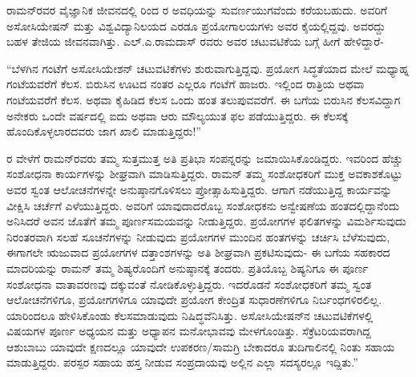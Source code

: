 ರಾಮನ್‍ರವರ ವೈಜ್ಞಾನಿಕ ಜೀವನದಲ್ಲಿ  ರಿಂದ ರ ಅವಧಿಯನ್ನು ಸುವರ್ಣಯುಗವೆಂದು ಕರೆಯಬಹುದು. ಅವರಿಗೆ ಅಸೋಸಿಯೇಷನ್ ಮತ್ತು ವಿಶ್ವವಿದ್ಯಾನಿಲಯದ ಎರಡೂ ಪ್ರಯೋಗಾಲಯಗಳು ಅವರ ಕೈಯಲ್ಲಿದ್ದವು. ಅವರದ್ದು ಬಹಳ ತೇಜಿಯ ಜೀವನವಾಗಿತ್ತು. ಎಲ್.ಎ.ರಾಮದಾಸ್ ರವರು ಅವರ ಚಟುವಟಿಕೆಯ ಬಗ್ಗೆ ಹೀಗೆ ಹೇಳಿದ್ದಾರೆ-

“ಬೆಳಗಿನ  ಗಂಟೆಗೆ ಅಸೋಸಿಯೇಶನ್ ಚಟುವಟಿಕೆಗಳು ಶುರುವಾಗುತ್ತಿದ್ದವು. ಪ್ರಯೋಗ ಸಿದ್ಧತೆಯಾದ ಮೇಲೆ ಮಧ್ಯಾಹ್ನ  ಗಂಟೆಯವರೆಗೆ ಕೆಲಸ. ಬಿರುಸಿನ ಊಟದ ನಂತರ ಎಲ್ಲರೂ  ಗಂಟೆಗೆ ಹಾಜರು. ಇಲ್ಲಿಂದ ರಾತ್ರಿಯ  ಅಥವಾ  ಗಂಟೆಯವರೆಗೆ ಕೆಲಸ. ಅಥವಾ ಕೈಹಿಡಿದ ಕೆಲಸ ಒಂದು ಹಂತ ತಲುಪುವವರೆಗೆ. ಈ ಬಗೆಯ ಬಿರುಸಿನ ಕೆಲಸವಿದ್ದಾಗ ಅನೇಕರು ಒಂದೇ ವರ್ಷದಲ್ಲಿ ಐದು ಅಥವಾ ಆರು ಮೌಲ್ಯಯುತ ಫಲ ಪಡೆಯುತ್ತಿದ್ದರು. ಈ ಕೆಲಸಕ್ಕೆ ಹೊಂದಿಕೊಳ್ಳಲಾರದವರು ಜಾಗ ಖಾಲಿ ಮಾಡುತ್ತಿದ್ದರು!”

ರ ವೇಳೆಗೆ ರಾಮನ್‍ರವರು ತಮ್ಮ ಸುತ್ತಮುತ್ತ ಅತಿ ಪ್ರತಿಭಾ ಸಂಪನ್ನರನ್ನು ಜಮಾಯಿಸಿಕೊಂಡಿದ್ದರು. ಇವರಿಂದ ಹೆಚ್ಚು ಸಂಶೋಧನಾ ಕಾರ್ಯಗಳನ್ನು ಶೀಘ್ರವಾಗಿ ಮಾಡಿಸುತ್ತಿದ್ದರು. ರಾಮನ್ ತಮ್ಮ ಸಂಶೋಧಕರಿಗೆ ಮುಕ್ತ ಅವಕಾಶಕೊಟ್ಟು ಅವರ ಸ್ವಂತ ಆಲೋಚನೆಗಳನ್ನೇ ಅನುಷ್ಠಾನಗೊಳಿಸಲು ಪ್ರೋತ್ಸಾಹಿಸುತ್ತಿದ್ದರು. ಆಗಾಗ ನಡೆಯುತ್ತಿದ್ದ ಕಾರ್ಯವನ್ನು ವೀಕ್ಷಿಸಿ ಚರ್ಚೆಗೆ ಎಳೆಯುತ್ತಿದ್ದರು. ಅವರಿಗೆ ಯಾವುದಾದರೊಬ್ಬ ಸಂಶೋಧಕನು ಅನ್ವೇಷಣೆಯ ಹಂತದಲ್ಲಿದ್ದಾನೆಂದು ಅನಿಸಿದರೆ ಅವನ ಜೊತೆಗೆ ತಮ್ಮ ಪೂರ್ಣಸಮಯವನ್ನು ನೀಡುತ್ತಿದ್ದರು. ಪ್ರಯೋಗಗಳ ಫಲಿತಗಳನ್ನು ವಿಮರ್ಶಿಸುವುದು ನಿರಂತರವಾಗಿ ಸಲಹೆ ಸೂಚನೆಗಳನ್ನು ನೀಡುವುದು ಪ್ರಯೋಗಗಳ ಮುಂದಿನ ಹಂತಗಳನ್ನು ಚರ್ಚಿಸಿ ಬೆಳೆಸುವುದು, ಈಗಾಗಲೇ ಋಜುವಾದ ಪ್ರಯೋಗಗಳ ದತ್ತಾಂಶಗಳನ್ನು ಅತಿ ಶೀಘ್ರವಾಗಿ ಪ್ರಕಟಿಸುವುದು- ಈ ಬಗೆಯ ಸಹಕಾರದ ಮಾದರಿಯನ್ನು ರಾಮನ್ ತಮ್ಮ ಶಿಷ್ಯರೊಂದಿಗೆ ಅನುಷ್ಠಾನಕ್ಕೆ ತಂದರು. ಪ್ರತಿಯೊಬ್ಬ ಶಿಷ್ಯನಿಗೂ ಈ ಪೂರ್ಣ ಸಂಶೋಧನಾ ವಾತಾವರಣವು ದಕ್ಕುವಂತೆ ನೋಡಿಕೊಳ್ಳುತ್ತಿದ್ದರು. ಇದರೊಡನೆ ಸಂಶೋಧಕರಿಗೆ ತಮ್ಮ ಸ್ವಂತ ಆಲೋಚನೆಗಳಿಗೂ, ಪ್ರಯೋಗಗಳಿಗೂ ಯಾವುದೇ ಪ್ರಯೋಗ ಕೇಂದ್ರಿತ ಸುಧಾರಣೆಗಳಿಗೂ ನಿರ್ಬಂಧಗಳಿರಲಿಲ್ಲ. ಯಾರಿಂದಲೂ ಹೇಳಿಸಿಕೊಂಡು ಕೆಲಸಮಾಡುವುದು ನಿಷಿದ್ಧವೆನಿಸಿತ್ತು. ಅಸೋಸಿಯೇಷನ್‍ನ ಚಟುವಟಿಕೆಗಳಲ್ಲಿ ವಿಷಯಗಳ ಪೂರ್ಣ ಅಧ್ಯಯನ ಮತ್ತು ಅಧ್ಯಾಪನ ಮನೋಭಾವವು ಮೇಳಗೊಂಡಿತ್ತು. ಸೆಕ್ರೆಟರಿಯವರಾಗಿದ್ದ ಆಶುಬಾಬು ಯಾವುದೇ ಕ್ಷಣದಲ್ಲೂ ಯಾವುದೇ ಉಪಕರಣ/ಸಾಮಗ್ರಿ ಬೇಕಾದರೂ ತುದಿಗಾಲಿನಲ್ಲಿ ನಿಂತು ಸಹಾಯ ಮಾಡುತ್ತಿದ್ದರು. ಪರಸ್ಪರ ಸಹಾಯ ಹಸ್ತ ನೀಡುವ ಸಂಪ್ರದಾಯವು ಅಲ್ಲಿನ ಎಲ್ಲಾ ಸದಸ್ಯರಲ್ಲೂ ಇದ್ದಿತು.”

